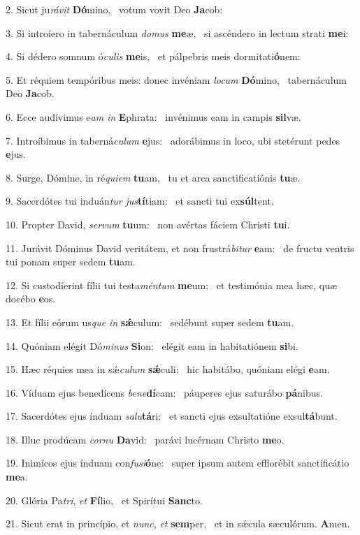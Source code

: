 2. Sicut ju\textit{rá}\textit{vit} \textbf{Dó}mino, \ast\  votum vovit Deo \textbf{Ja}cob:\

3. Si introíero in tabernáculum \textit{do}\textit{mus} \textbf{me}æ, \ast\  si ascéndero in lectum strati \textbf{me}i:\

4. Si dédero somnum ó\textit{cu}\textit{lis} \textbf{me}is, \ast\  et pálpebris meis dormitati\textbf{ó}nem:\

5. Et réquiem tempóribus meis: donec invéniam \textit{lo}\textit{cum} \textbf{Dó}mino, \ast\  tabernáculum Deo \textbf{Ja}cob.\

6. Ecce audívimus e\textit{am} \textit{in} \textbf{E}phrata: \ast\  invénimus eam in campis \textbf{sil}væ.\

7. Introíbimus in taberná\textit{cu}\textit{lum} \textbf{e}jus: \ast\  adorábimus in loco, ubi stetérunt pedes \textbf{e}jus.\

8. Surge, Dómine, in ré\textit{qui}\textit{em} \textbf{tu}am, \ast\  tu et arca sanctificatiónis \textbf{tu}æ.\

9. Sacerdótes tui induán\textit{tur} \textit{jus}\textbf{tí}tiam: \ast\  et sancti tui ex\textbf{súl}tent.\

10. Propter David, \textit{ser}\textit{vum} \textbf{tu}um: \ast\  non avértas fáciem Christi \textbf{tu}i.\

11. Jurávit Dóminus David veritátem, et non frustrá\textit{bi}\textit{tur} \textbf{e}am: \ast\  de fructu ventris tui ponam super sedem \textbf{tu}am.\

12. Si custodíerint fílii tui testa\textit{mén}\textit{tum} \textbf{me}um: \ast\  et testimónia mea hæc, quæ docébo \textbf{e}os.\

13. Et fílii eórum us\textit{que} \textit{in} \textbf{sǽ}culum: \ast\  sedébunt super sedem \textbf{tu}am.\

14. Quóniam elégit Dó\textit{mi}\textit{nus} \textbf{Si}on: \ast\  elégit eam in habitatiónem \textbf{si}bi.\

15. Hæc réquies mea in sǽ\textit{cu}\textit{lum} \textbf{sǽ}culi: \ast\  hic habitábo, quóniam elégi \textbf{e}am.\

16. Víduam ejus benedícens \textit{be}\textit{ne}\textbf{dí}cam: \ast\  páuperes ejus saturábo \textbf{pá}nibus.\

17. Sacerdótes ejus índuam \textit{sa}\textit{lu}\textbf{tá}ri: \ast\  et sancti ejus exsultatióne exsul\textbf{tá}bunt.\

18. Illuc prodúcam \textit{cor}\textit{nu} \textbf{Da}vid: \ast\  parávi lucérnam Christo \textbf{me}o.\

19. Inimícos ejus índuam con\textit{fu}\textit{si}\textbf{ó}ne: \ast\  super ipsum autem efflorébit sanctificátio \textbf{me}a.\

20. Glória Pa\textit{tri}, \textit{et} \textbf{Fí}lio, \ast\  et Spirítui \textbf{Sanc}to.\

21. Sicut erat in princípio, et \textit{nunc}, \textit{et} \textbf{sem}per, \ast\  et in sǽcula sæculórum. \textbf{A}men.\


